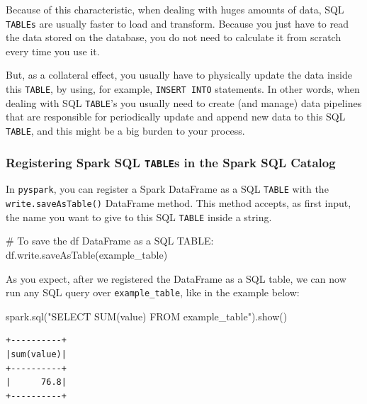\documentclass[
  11pt,
  letterpaper,
  DIV=11,
  numbers=noendperiod]{scrreprt}
\newenvironment{Shaded}{\begin{snugshade}}{\end{snugshade}}
\newcommand{\CommentTok}[1]{\textcolor[rgb]{0.37,0.37,0.37}{#1}}
\newcommand{\NormalTok}[1]{\textcolor[rgb]{0.00,0.23,0.31}{#1}}
\newcommand{\StringTok}[1]{\textcolor[rgb]{0.13,0.47,0.30}{#1}}
\begin{document}
Because of this characteristic, when dealing with huges amounts of data,
SQL \texttt{TABLEs} are usually faster to load and transform. Because
you just have to read the data stored on the database, you do not need
to calculate it from scratch every time you use it.

But, as a collateral effect, you usually have to physically update the
data inside this \texttt{TABLE}, by using, for example,
\texttt{INSERT\ INTO} statements. In other words, when dealing with SQL
\texttt{TABLE}'s you usually need to create (and manage) data pipelines
that are responsible for periodically update and append new data to this
SQL \texttt{TABLE}, and this might be a big burden to your process.

\subsubsection{\texorpdfstring{Registering Spark SQL \texttt{TABLE}s in
the Spark SQL
Catalog}{Registering Spark SQL TABLEs in the Spark SQL Catalog}}\label{registering-spark-sql-tables-in-the-spark-sql-catalog}

In \texttt{pyspark}, you can register a Spark DataFrame as a SQL
\texttt{TABLE} with the \texttt{write.saveAsTable()} DataFrame method.
This method accepts, as first input, the name you want to give to this
SQL \texttt{TABLE} inside a string.

\begin{Shaded}
\begin{Highlighting}[]
\CommentTok{\# To save the \textasciigrave{}df\textasciigrave{} DataFrame as a SQL TABLE:}
\NormalTok{df.write.saveAsTable(}\StringTok{\textquotesingle{}example\_table\textquotesingle{}}\NormalTok{)}
\end{Highlighting}
\end{Shaded}

As you expect, after we registered the DataFrame as a SQL table, we can
now run any SQL query over \texttt{example\_table}, like in the example
below:

\begin{Shaded}
\begin{Highlighting}[]
\NormalTok{spark.sql(}\StringTok{"SELECT SUM(value) FROM example\_table"}\NormalTok{).show()}
\end{Highlighting}
\end{Shaded}

\begin{verbatim}
+----------+
|sum(value)|
+----------+
|      76.8|
+----------+
\end{verbatim}
\end{document}
